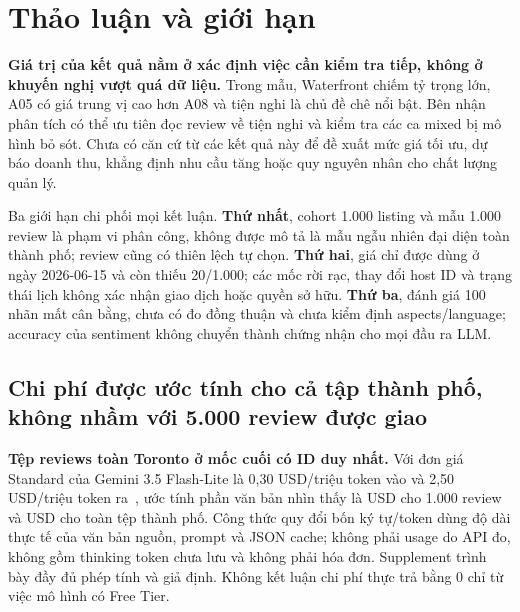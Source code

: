 \documentclass[11pt,a4paper]{article}
\begin{document}
\clearpage
\section{Thảo luận và giới hạn}
\textbf{Giá trị của kết quả nằm ở xác định việc cần kiểm tra tiếp, không ở khuyến nghị vượt quá dữ liệu.} Trong mẫu, Waterfront chiếm tỷ trọng lớn, A05 có giá trung vị cao hơn A08 và tiện nghi là chủ đề chê nổi bật. Bên nhận phân tích có thể ưu tiên đọc review về tiện nghi và kiểm tra các ca mixed bị mô hình bỏ sót. Chưa có căn cứ từ các kết quả này để đề xuất mức giá tối ưu, dự báo doanh thu, khẳng định nhu cầu tăng hoặc quy nguyên nhân cho chất lượng quản lý.

Ba giới hạn chi phối mọi kết luận. \textbf{Thứ nhất}, cohort 1.000 listing và mẫu 1.000 review là phạm vi phân công, không được mô tả là mẫu ngẫu nhiên đại diện toàn thành phố; review cũng có thiên lệch tự chọn. \textbf{Thứ hai}, giá chỉ được dùng ở ngày 2026-06-15 và còn thiếu 20/1.000; các mốc rời rạc, thay đổi host ID và trạng thái lịch không xác nhận giao dịch hoặc quyền sở hữu. \textbf{Thứ ba}, đánh giá 100 nhãn mất cân bằng, chưa có đo đồng thuận và chưa kiểm định aspects/language; accuracy của sentiment không chuyển thành chứng nhận cho mọi đầu ra LLM.

\subsection{Chi phí được ước tính cho cả tập thành phố, không nhầm với 5.000 review được giao}
\textbf{Tệp reviews toàn Toronto ở mốc cuối có \CityReviewCount{} ID duy nhất.} Với đơn giá Standard của Gemini 3.5 Flash-Lite là 0,30 USD/triệu token vào và 2,50 USD/triệu token ra~\cite{pricing}, ước tính phần văn bản nhìn thấy là \SampleCost{} USD cho 1.000 review và \CityCost{} USD cho toàn tệp thành phố. Công thức quy đổi bốn ký tự/token dùng độ dài thực tế của văn bản nguồn, prompt và JSON cache; không phải usage do API đo, không gồm thinking token chưa lưu và không phải hóa đơn. Supplement trình bày đầy đủ phép tính và giả định. Không kết luận chi phí thực trả bằng 0 chỉ từ việc mô hình có Free Tier.
\end{document}
